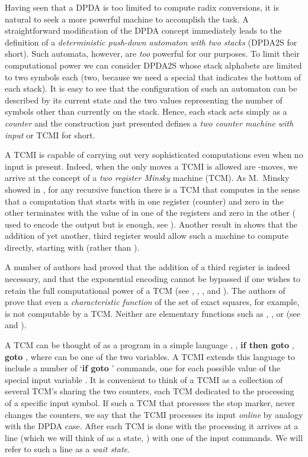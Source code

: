 \documentclass[12pt]{article}
\begin{document}
Having seen that a DPDA is too limited to
compute radix conversions, it is natural to seek a more powerful
machine to accomplish the task. A straightforward modification of the
DPDA concept immediately leads to the definition of a {\it
  deterministic push-down automaton with two stacks} (DPDA2S for short). Such automata,
however, are {\it too\/} powerful for our purposes. To limit
their computational power we can consider DPDA2S whose stack
alphabets are limited to two symbols each (two, because we need a
special  that indicates the bottom of each stack). It is easy to
see that the configuration of such an automaton can be described by its
current state and the two values representing the number of symbols other
than  currently on the stack. Hence, each stack acts simply as a
{\it counter\/} and the construction just presented defines a {\it two
counter machine with input\/} or TCMI for short.

A TCMI is capable of carrying out very sophisticated
computations even when no input is present. Indeed, when the
only moves a TCMI is allowed are -moves, we arrive at the
concept of a {\it two register Minsky\/} machine (TCM). As M.~Minsky showed
in \cite{Minsky}, for any recursive function  there is a TCM that
computes  in the sense that a computation that starts with 
in one register (counter) and zero in the other terminates with the
value of  in one of the registers and zero in the
other (\cite{Minsky} used  to encode the output but  is
enough, see \cite{Bardz}). Another result in \cite{Minsky} shows that the addition of yet
another, third register would allow such a machine to compute 
directly, starting with  (rather than ).

A number of authors had proved that the addition of a third register is
indeed necessary, and that the exponential encoding cannot be bypassed if
one wishes to retain the full computational power of a TCM (see
\cite{Schroep}, \cite{ibarra}, \cite{Bardz}, and \cite{holkutr}). The authors of
\cite{ibarra} prove that even a {\it characteristic function\/} of the
set of exact squares, for example, is not computable by a TCM. Neither
are elementary functions such as , , or  (see
\cite{Bardz} and \cite{Schroep}).

A TCM can be thought of as a program in a simple language
, , {\bf if  then goto
  }, {\bf goto },  where  can be one of
the two variables. A TCMI extends this language to include a number of `{\bf if
   goto }' commands, one for each possible value  of the
special input variable . It is convenient to think of a TCMI as a
collection of several TCM's sharing the two counters, each TCM
dedicated to the processing of a specific input symbol. If such a TCM
that processes the stop marker,  never changes the counters, we say that the
TCMI processes its input {\it online} by analogy with the DPDA case.
After each TCM is done with the processing it arrives at a line (which
we will think of as a state, ) with one of the input commands. We
will refer to such a line as a {\it wait state\/}.
\end{document}
